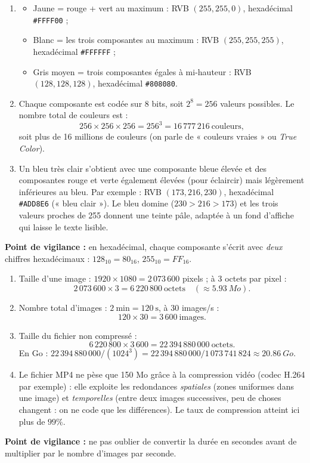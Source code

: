 \documentclass[11pt]{article}
\newcommand{\cle}[1]{{\popxbold\color{popdark}#1}}
\begin{document}
\begin{corrige}
\begin{enumerate}
  \item \begin{itemize}
    \item Jaune = rouge + vert au maximum : RVB $(255, 255, 0)$, hexadécimal \texttt{\#FFFF00} ;
    \item Blanc = les trois composantes au maximum : RVB $(255, 255, 255)$, hexadécimal \texttt{\#FFFFFF} ;
    \item Gris moyen = trois composantes égales à mi-hauteur : RVB $(128, 128, 128)$, hexadécimal \texttt{\#808080}.
  \end{itemize}
  \item Chaque composante est codée sur 8 bits, soit $2^8 = 256$ valeurs possibles. Le nombre total de couleurs est :
  \[ 256 \times 256 \times 256 = 256^3 = 16\,777\,216~\text{couleurs}, \]
  soit plus de 16 millions de couleurs (on parle de « couleurs vraies » ou \emph{True Color}).
  \item Un bleu très clair s'obtient avec une composante bleue élevée et des composantes rouge et verte également élevées (pour éclaircir) mais légèrement inférieures au bleu. Par exemple : RVB $(173, 216, 230)$, hexadécimal \texttt{\#ADD8E6} (« bleu clair »). Le bleu domine ($230 > 216 > 173$) et les trois valeurs proches de 255 donnent une teinte pâle, adaptée à un fond d'affiche qui laisse le texte lisible.
\end{enumerate}
\textbf{Point de vigilance :} en hexadécimal, chaque composante s'écrit avec \emph{deux} chiffres hexadécimaux : $128_{10} = 80_{16}$, $255_{10} = FF_{16}$.
\end{corrige}

\begin{corrige}
\begin{enumerate}
  \item Taille d'une image : $1920 \times 1080 = 2\,073\,600$ pixels ; à 3 octets par pixel :
  \[ 2\,073\,600 \times 3 = 6\,220\,800~\text{octets} \quad (\approx \SI{5,93}{Mo}). \]
  \item Nombre total d'images : $2~\text{min} = 120~\text{s}$, à 30 images/s :
  \[ 120 \times 30 = 3\,600~\text{images}. \]
  \item Taille du fichier non compressé :
  \[ 6\,220\,800 \times 3\,600 = 22\,394\,880\,000~\text{octets}. \]
  En Go : $22\,394\,880\,000 / (1024^3) = 22\,394\,880\,000 / 1\,073\,741\,824 \approx \SI{20,86}{Go}$.
  \item Le fichier MP4 ne pèse que 150 Mo grâce à la \cle{compression} vidéo (codec H.264 par exemple) : elle exploite les redondances \emph{spatiales} (zones uniformes dans une image) et \emph{temporelles} (entre deux images successives, peu de choses changent : on ne code que les différences). Le taux de compression atteint ici plus de $99\%$.
\end{enumerate}
\textbf{Point de vigilance :} ne pas oublier de convertir la durée en secondes avant de multiplier par le nombre d'images par seconde.
\end{corrige}
\end{document}
